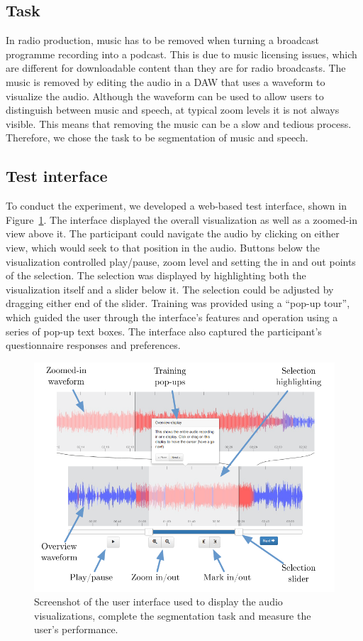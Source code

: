 \subsection{Task}
In radio production, music has to be removed when turning a broadcast programme recording into a podcast. This is due
to music licensing issues, which are different for downloadable content than they are for radio broadcasts. The music
is removed by editing the audio in a DAW that uses a waveform to visualize the audio. Although the waveform can be
used to allow users to distinguish between music and speech, at typical zoom levels it is not always visible. This
means that removing the music can be a slow and tedious process. Therefore, we chose the task to be segmentation of
music and speech.

\subsection{Test interface}

To conduct the experiment, we developed a web-based test interface, shown in Figure~\ref{fig:visualization-interface}.
The interface displayed the overall visualization as well as a zoomed-in view above it. The participant could navigate
the audio by clicking on either view, which would seek to that position in the audio.  Buttons below the visualization
controlled play/pause, zoom level and setting the in and out points of the selection.  The selection was displayed by
highlighting both the visualization itself and a slider below it. The selection could be adjusted by dragging either
end of the slider.  Training was provided using a ``pop-up tour'', which guided the user through the interface's
features and operation using a series of pop-up text boxes.  The interface also captured the participant's
questionnaire responses and preferences.

\begin{figure}[p]
\centering
\includegraphics[width=\columnwidth]{figs/browser-audio-interface}
\caption{Screenshot of the user interface used to display the audio visualizations, complete the segmentation task and
measure the user's performance.}
\label{fig:visualization-interface}
\end{figure}



